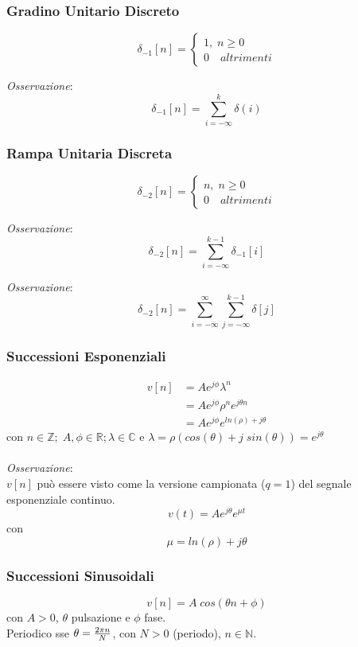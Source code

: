\documentclass{article}
\begin{document}
			\subsubsection{Gradino Unitario Discreto}
				\[
					\delta_{-1}[n]=
					\begin{cases}
						1,\; n\geq0 \\
						0\quad altrimenti
					\end{cases}
				\]

				\textit{Osservazione}:
				\[
					\delta_{-1}[n]=\sum_{i=-\infty}^{k}{\delta(i)}
				\]

			\subsubsection{Rampa Unitaria Discreta}
				\[
					\delta_{-2}[n]=
					\begin{cases}
						n,\; n\geq0 \\
						0\quad altrimenti
					\end{cases}
				\]

				\textit{Osservazione}:
				\[
					\delta_{-2}[n]=\sum_{i=-\infty}^{k-1}{\delta_{-1}[i]}
				\]

				\textit{Osservazione}:
				\[
					\delta_{-2}[n]=\sum_{i=-\infty}^{\infty}{\sum_{j=-\infty}^{k-1}{\delta[j]}}
				\]

			\subsubsection{Successioni Esponenziali}
				\[
					\begin{aligned}
						v[n]&=Ae^{j\phi}\lambda^n \\
							&=Ae^{j\phi}\rho^{n}e^{j\theta n} \\
							&=Ae^{j\phi}e^{ln(\rho)+j\theta}
					\end{aligned}
				\]
				con $ n \in \mathbb{Z};\; A, \phi \in \mathbb{R}; \lambda \in \mathbb{C} $ e $ \lambda=\rho(cos(\theta) + j\;sin(\theta))=e^{j\theta} $ \\
				\\
				\textit{Osservazione}: \\
				$ v[n] $ può essere visto come la versione campionata ($ q=1 $) del segnale esponenziale continuo.
				\[
					v(t)=Ae^{j\theta}e^{\mu t}
				\]
				con
				\[
					\mu=ln(\rho)+j\theta
				\]

			\subsubsection{Successioni Sinusoidali}
				\[
					v[n]=A\;cos(\theta n + \phi)
				\]
				con $ A>0 $, $ \theta $ pulsazione e $ \phi $ fase. \\
				Periodico sse $ \theta={{2\pi n}\over{N}} $, con $ N>0 $ (periodo), $ n \in \mathbb{N} $.
\end{document}
